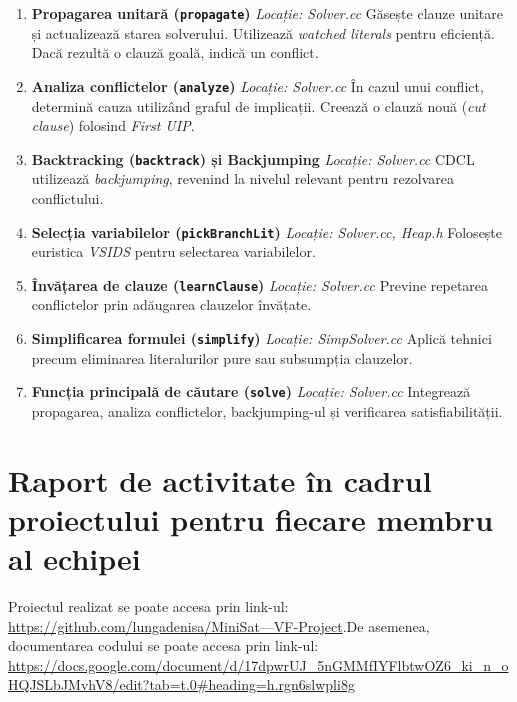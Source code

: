 \documentclass[12pt,a4paper]{report}
\begin{document}
\begin{enumerate}[label=\arabic*.]
    \item \textbf{Propagarea unitară (\texttt{propagate})}  
    \textit{Locație: Solver.cc}  
    Găsește clauze unitare și actualizează starea solverului. Utilizează \textit{watched literals} pentru eficiență. Dacă rezultă o clauză goală, indică un conflict.

    \item \textbf{Analiza conflictelor (\texttt{analyze})}  
    \textit{Locație: Solver.cc}  
    În cazul unui conflict, determină cauza utilizând graful de implicații. Creează o clauză nouă (\textit{cut clause}) folosind \textit{First UIP}.

    \item \textbf{Backtracking (\texttt{backtrack}) și Backjumping}  
    \textit{Locație: Solver.cc}  
    CDCL utilizează \textit{backjumping}, revenind la nivelul relevant pentru rezolvarea conflictului.

    \item \textbf{Selecția variabilelor (\texttt{pickBranchLit})}  
    \textit{Locație: Solver.cc, Heap.h}  
    Folosește euristica \textit{VSIDS} pentru selectarea variabilelor.

    \item \textbf{Învățarea de clauze (\texttt{learnClause})}  
    \textit{Locație: Solver.cc}  
    Previne repetarea conflictelor prin adăugarea clauzelor învățate.

    \item \textbf{Simplificarea formulei (\texttt{simplify})}  
    \textit{Locație: SimpSolver.cc}  
    Aplică tehnici precum eliminarea literalurilor pure sau subsumpția clauzelor.

    \item \textbf{Funcția principală de căutare (\texttt{solve})}  
    \textit{Locație: Solver.cc}  
    Integrează propagarea, analiza conflictelor, backjumping-ul și verificarea satisfiabilității.
\end{enumerate}



\chapter{Raport de activitate în cadrul proiectului pentru fiecare membru al echipei}
Proiectul realizat se poate accesa prin link-ul: \href{https://github.com/lungadenisa/MiniSat---VF-Project}{https://github.com/lungadenisa/MiniSat---VF-Project}.De asemenea, documentarea codului se poate accesa prin link-ul:
\url{https://docs.google.com/document/d/17dpwrUJ_5nGMMfIYFlbtwOZ6_ki_n_oHQJSLbJMvhV8/edit?tab=t.0#heading=h.rgn6slwpli8g}
\end{document}
